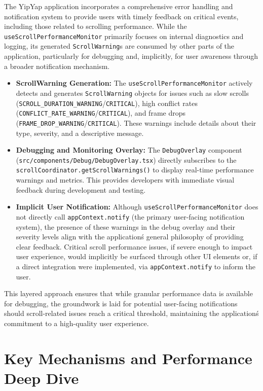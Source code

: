 \documentclass[10pt]{article}
\begin{document}
The YipYap application incorporates a comprehensive error handling and notification system to provide users with timely feedback on critical events, including those related to scrolling performance. While the \texttt{useScrollPerformanceMonitor} primarily focuses on internal diagnostics and logging, its generated \texttt{ScrollWarning}s are consumed by other parts of the application, particularly for debugging and, implicitly, for user awareness through a broader notification mechanism.
\begin{itemize}
    \item \textbf{ScrollWarning Generation:} The \texttt{useScrollPerformanceMonitor} actively detects and generates \texttt{ScrollWarning} objects for issues such as slow scrolls (\texttt{SCROLL\_DURATION\_WARNING}/\texttt{CRITICAL}), high conflict rates (\texttt{CONFLICT\_RATE\_WARNING}/\texttt{CRITICAL}), and frame drops (\texttt{FRAME\_DROP\_WARNING}/\texttt{CRITICAL}). These warnings include details about their type, severity, and a descriptive message.
    \item \textbf{Debugging and Monitoring Overlay:} The \texttt{DebugOverlay} component (\texttt{src/components/Debug/DebugOverlay.tsx}) directly subscribes to the \texttt{scrollCoordinator.getScrollWarnings()} to display real-time performance warnings and metrics. This provides developers with immediate visual feedback during development and testing.
    \item \textbf{Implicit User Notification:} Although \texttt{useScrollPerformanceMonitor} does not directly call \texttt{appContext.notify} (the primary user-facing notification system), the presence of these warnings in the debug overlay and their severity levels align with the application\'s general philosophy of providing clear feedback. Critical scroll performance issues, if severe enough to impact user experience, would implicitly be surfaced through other UI elements or, if a direct integration were implemented, via \texttt{appContext.notify} to inform the user.
\end{itemize}
This layered approach ensures that while granular performance data is available for debugging, the groundwork is laid for potential user-facing notifications should scroll-related issues reach a critical threshold, maintaining the application\'s commitment to a high-quality user experience.

\section{Key Mechanisms and Performance Deep Dive}
\end{document}
